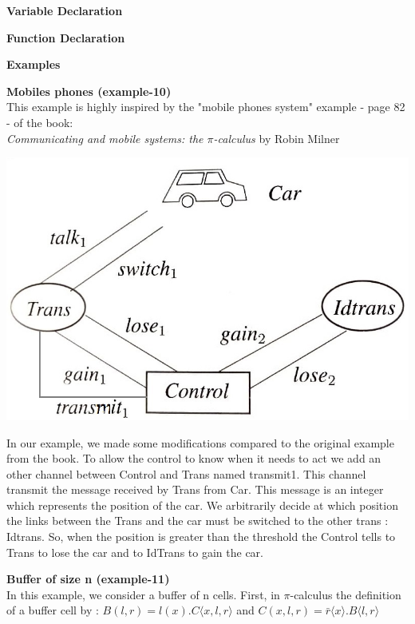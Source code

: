 \documentclass[11pt]{report}
\begin{document}
\tabto{0cm} {\large \textbf{Variable Declaration}}
\begin{prooftree}
\end{prooftree}

\tabto{0cm} {\large \textbf{Function Declaration}}

\newpage
\centerline{\textbf{\Huge Examples}}
\vspace*{3pt}
\vspace*{20pt}
\tabto{0cm} {\Large \textbf{Mobiles phones (example-10)}}
\vspace*{3pt}
\\
This example is highly inspired by the "mobile phones system" example - page 82 - of the book: \\
\textit{Communicating and mobile systems: the $\pi$-calculus} by Robin Milner 

\begin{center}
\includegraphics[scale = 0.5]{mobile-phone-system.jpg}
\end{center}
In our example, we made some modifications compared to the original example from the book. To allow the control to know when it needs to act we add an other channel between Control and Trans named transmit1. This channel transmit the message received by Trans from Car. This message is an integer which represents the position of the car. We arbitrarily decide at which position the links between the Trans and the car must be switched to the other trans : Idtrans. So, when the position is greater than the threshold the Control tells to Trans to lose the car and to IdTrans to gain the car.

\vspace*{15pt}
\tabto{0cm} {\Large \textbf{Buffer of size n (example-11)}}
\vspace*{3pt}
\\
In this example, we consider a buffer of n cells. First, in $\pi$-calculus the definition of a buffer cell by :
$B(l,r) = l(x).C \langle x,l,r \rangle$ and $C(x,l,r) = \bar{r} \langle x \rangle .B \langle l,r \rangle$
\end{document}

